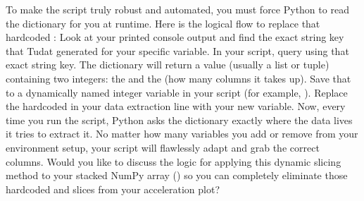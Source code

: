 {}
\markdownRendererSectionEnd \markdownRendererSectionBegin
{}\markdownRendererInterblockSeparator
{}To make the script truly robust and automated, you must force Python to read the dictionary for you at runtime. Here is the logical flow to replace that hardcoded \markdownRendererCodeSpan{[28]}:\markdownRendererInterblockSeparator
{}\markdownRendererOlBegin
{} Look at your printed console output and find the exact string key that Tudat generated for your specific variable.\markdownRendererOlItemEnd 
{} In your script, query  using that exact string key. The dictionary will return a value (usually a list or tuple) containing two integers: the  and the  (how many columns it takes up).\markdownRendererOlItemEnd 
{} Save that  to a dynamically named integer variable in your script (for example, ).\markdownRendererOlItemEnd 
{} Replace the hardcoded \markdownRendererCodeSpan{[28]} in your data extraction line with your new  variable.\markdownRendererOlItemEnd 
\markdownRendererOlEnd \markdownRendererInterblockSeparator
{}Now, every time you run the script, Python asks the dictionary exactly where the data lives  it tries to extract it. No matter how many variables you add or remove from your environment setup, your script will flawlessly adapt and grab the correct columns.\markdownRendererInterblockSeparator
{}\markdownRendererThematicBreak{}\markdownRendererInterblockSeparator
{}Would you like to discuss the logic for applying this dynamic slicing method to your stacked NumPy array () so you can completely eliminate those hardcoded \markdownRendererCodeSpan{[:, 9:12]} and \markdownRendererCodeSpan{[:, 12:15]} slices from your acceleration plot?\markdownRendererInterblockSeparator
